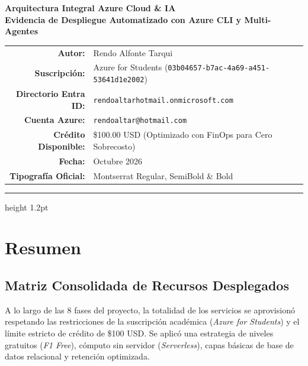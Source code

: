 \documentclass[11pt,a4paper]{article}
\begin{document}
\begin{center}
  \vspace*{0.3cm}
  {\Huge \textbf{\textcolor{azurenavy}{Arquitectura Integral Azure Cloud \& IA}}}\\[0.3cm]
  {\Large \textcolor{azureblue}{\textbf{Evidencia de Despliegue Automatizado con Azure CLI y Multi-Agentes}}}\\[0.5cm]
  
  \begin{tabular}{rl}
    \textbf{Autor:} & Rendo Alfonte Tarqui \\
    \textbf{Suscripción:} & Azure for Students (\texttt{03b04657-b7ac-4a69-a451-53641d1e2002}) \\
    \textbf{Directorio Entra ID:} & \texttt{rendoaltarhotmail.onmicrosoft.com} \\
    \textbf{Cuenta Azure:} & \texttt{rendoaltar@hotmail.com} \\
    \textbf{Crédito Disponible:} & \$100.00 USD (Optimizado con FinOps para Cero Sobrecosto) \\
    \textbf{Fecha:} & Octubre 2026 \\
    \textbf{Tipografía Oficial:} & Montserrat Regular, SemiBold \& Bold
  \end{tabular}
  \vspace{0.6cm}
  \hrule height 1.2pt
  \vspace{0.4cm}
\end{center}

\tableofcontents
\newpage


\newpage


\newpage


\newpage


\newpage


\newpage


\newpage


\newpage



\newpage
\section{Resumen}
\subsection{Matriz Consolidada de Recursos Desplegados}
A lo largo de las 8 fases del proyecto, la totalidad de los servicios se aprovisionó respetando las restricciones de la suscripción académica (\textit{Azure for Students}) y el límite estricto de crédito de \$100 USD. Se aplicó una estrategia de niveles gratuitos (\textit{F1 Free}), cómputo sin servidor (\textit{Serverless}), capas básicas de base de datos relacional y retención optimizada.
\end{document}
